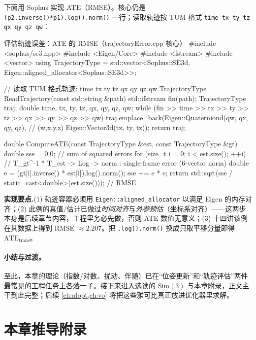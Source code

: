 下面用 Sophus 实现 ATE（RMSE）。核心仍是 \texttt{(p2.inverse()*p1).log().norm()} 一行；读取轨迹按 TUM 格式 \texttt{time tx ty tz qx qy qz qw}：

\begin{codebox}[C++]{评估轨迹误差：ATE 的 RMSE（trajectoryError.cpp 核心）}
#include <sophus/se3.hpp>
#include <Eigen/Core>
#include <fstream>
#include <vector>
using TrajectoryType =
    std::vector<Sophus::SE3d, Eigen::aligned_allocator<Sophus::SE3d>>;

// 读取 TUM 格式轨迹: time tx ty tz qx qy qz qw
TrajectoryType ReadTrajectory(const std::string &path) {
  std::ifstream fin(path);
  TrajectoryType traj;
  double time, tx, ty, tz, qx, qy, qz, qw;
  while (fin >> time >> tx >> ty >> tz >> qx >> qy >> qz >> qw)
    traj.emplace_back(Eigen::Quaterniond(qw, qx, qy, qz),  // (w,x,y,z)
                      Eigen::Vector3d(tx, ty, tz));
  return traj;
}

double ComputeATE(const TrajectoryType &est, const TrajectoryType &gt) {
  double sse = 0.0;                       // sum of squared errors
  for (size_t i = 0; i < est.size(); ++i) {
    // T_gt^-1 * T_est -> Log -> norm : single-frame error (6-vector norm)
    double e = (gt[i].inverse() * est[i]).log().norm();
    sse += e * e;
  }
  return std::sqrt(sse / static_cast<double>(est.size()));   // RMSE
}
\end{codebox}

\begin{note}
\textbf{实现要点.}\;(1) 轨迹容器必须用 \texttt{Eigen::aligned\_allocator} 以满足 Eigen 的内存对齐；(2) 此例的真值/估计已做过\emph{时间对齐}与\emph{外参预估}（坐标系对齐）——这两步本身是后续章节内容，工程里务必先做，否则 ATE 数值无意义；(3) 十四讲该例在其数据上得到 RMSE $\approx 2.207$。把 \texttt{.log().norm()} 换成只取平移分量即得 $\mathrm{ATE}_{\text{trans}}$。
\end{note}

\paragraph{小结与过渡。}至此，本章的理论（指数/对数、扰动、伴随）已在“位姿更新”和“轨迹评估”两件最常见的工程任务上各落一子。接下来进入选读的 $\mathrm{Sim}(3)$ 与本章附录，正文主干到此完整；后续 \cref{ch:nlopt,ch:vo} 将把这些雅可比真正放进优化器里求解。

\section{本章推导附录}
\label{sec:lie-appendix}

